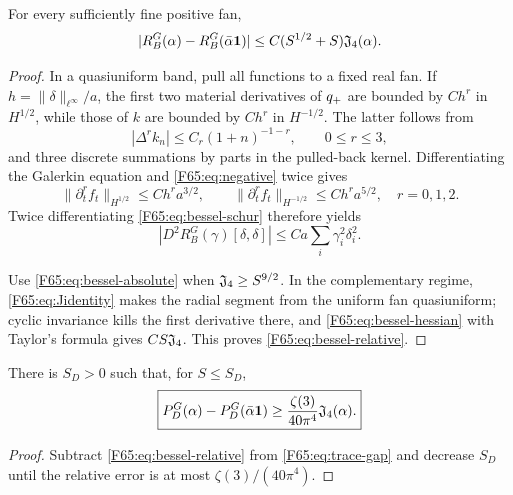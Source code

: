 \begin{proposition}\label{F65:prop:bessel-relative}
For every sufficiently fine positive fan,
\begin{equation}\label{F65:eq:bessel-relative}
 |R_B^G(\alpha)-R_B^G(\bar\alpha\mathbf1)|
 \le C(S^{1/2}+S)\mathfrak J_4(\alpha).
\end{equation}
\end{proposition}

\begin{proof}
In a quasiuniform band, pull all functions to a fixed real fan.  If
$h=\|\delta\|_{\ell^\infty}/a$, the first two material derivatives of
$q_+$ are bounded by $Ch^r$ in $H^{1/2}$, while those of $k$ are bounded
by $Ch^r$ in $H^{-1/2}$.  The latter follows from
\begin{equation}
 |\Delta^rk_n|\le C_r(1+n)^{-1-r},\qquad 0\le r\le3,
\end{equation}
and three discrete summations by parts in the pulled-back kernel.
Differentiating the Galerkin equation and \eqref{F65:eq:negative} twice gives
\begin{equation}
 \|\partial_t^rf_t\|_{H^{1/2}}\le Ch^ra^{3/2},
 \qquad
 \|\partial_t^rf_t\|_{H^{-1/2}}\le Ch^ra^{5/2},
 \quad r=0,1,2.
\end{equation}
Twice differentiating \eqref{F65:eq:bessel-schur} therefore yields
\begin{equation}\label{F65:eq:bessel-hessian}
 |D^2R_B^G(\gamma)[\delta,\delta]|
 \le Ca\sum_i\gamma_i^2\delta_i^2.
\end{equation}

Use \eqref{F65:eq:bessel-absolute} when
$\mathfrak J_4\ge S^{9/2}$.  In the complementary regime,
\eqref{F65:eq:Jidentity} makes the radial segment from the uniform fan
quasiuniform; cyclic invariance kills the first derivative there, and
\eqref{F65:eq:bessel-hessian} with Taylor's formula gives
$CS\mathfrak J_4$.  This proves \eqref{F65:eq:bessel-relative}.
\end{proof}

\begin{corollary}\label{F65:cor:bessel-gap}
There is $S_D>0$ such that, for $S\le S_D$,
\begin{equation}\label{F65:eq:bessel-gap}
 \boxed{
 P_D^G(\alpha)-P_D^G(\bar\alpha\mathbf1)
 \ge\frac{\zeta(3)}{40\pi^4}\mathfrak J_4(\alpha).}
\end{equation}
\end{corollary}

\begin{proof}
Subtract \eqref{F65:eq:bessel-relative} from \eqref{F65:eq:trace-gap} and decrease
$S_D$ until the relative error is at most $\zeta(3)/(40\pi^4)$.
\end{proof}

